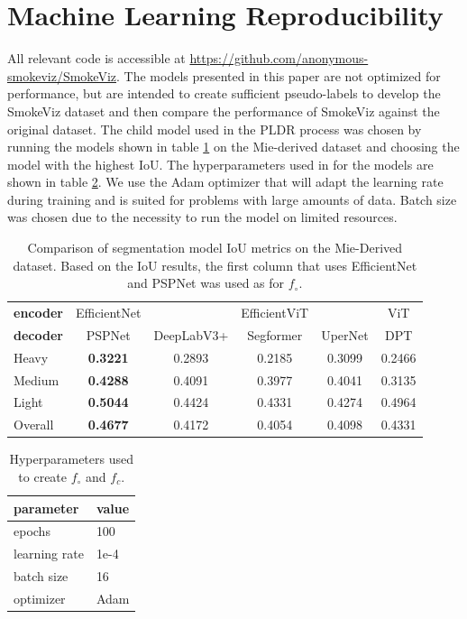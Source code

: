 \documentclass{article}
\begin{document}
\section{Machine Learning Reproducibility}

All relevant code is accessible at \url{https://github.com/anonymous-smokeviz/SmokeViz}. The models presented in this paper are not optimized for performance, but are intended to create sufficient pseudo-labels to develop the SmokeViz dataset and then compare the performance of SmokeViz against the original dataset. The child model used in the PLDR process was chosen by running the models shown in table \ref{child} on the Mie-derived dataset and choosing the model with the highest IoU. The hyperparameters used in for the models are shown in table \ref{hyper}. We use the Adam optimizer that will adapt the learning rate during training and is suited for problems with large amounts of data. Batch size was chosen due to the necessity to run the model on limited resources. 

\begin{table}[!htb] 
    \caption{Comparison of segmentation model IoU metrics on the Mie-Derived dataset. Based on the IoU results, the first column that uses EfficientNet and PSPNet was used as for \(f_{\circ}\).}\label{child}
    \centering
    \begin{tabular}{lccccc}
        \toprule
        \textbf{encoder} & EfficientNet\cite{efficientnetv2} & \cite{efficientnetv2} & EfficientViT\cite{efficientvit} & \cite{efficientvit}& ViT \cite{vit} \\
        \textbf{decoder} &  PSPNet\cite{pspnet} & DeepLabV3+\cite{deeplab} & Segformer\cite{segformer} & UperNet \cite{upernet}& DPT\cite{dpt} \\
        \midrule
        Heavy   &	\textbf{0.3221}	& 0.2893	&	0.2185	&	0.3099	&	0.2466 \\
        Medium  &	\textbf{0.4288}	& 0.4091	&	0.3977	&   0.4041	&	0.3135 \\
        Light   &	\textbf{0.5044}	& 0.4424	&	0.4331	&	0.4274	&	0.4964 \\
        Overall &	\textbf{0.4677}	& 0.4172	&   0.4054	&	0.4098	&	0.4331 \\
        \bottomrule
    \end{tabular}
\end{table}

\begin{table}
    \caption{Hyperparameters used to create \(f_{\circ}\) and \(f_{c}\).}
  \label{hyper}
  \centering
  \begin{tabular}{ll}
    \toprule
    parameter & value \\ 
    \midrule
    epochs & 100 \\
    learning rate & 1e-4 \\
    batch size & 16 \\
    optimizer & Adam \\
    \bottomrule
  \end{tabular}
\end{table}



\end{document}
